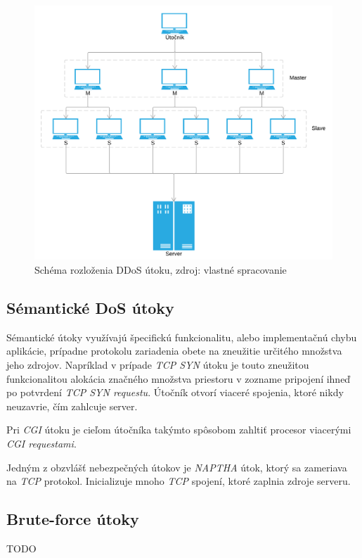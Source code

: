 \documentclass[
  printed, %
  table,   %
  lof,     %
  lot,     %
]{fithesis3}
\begin{document}
\begin{figure}[H]
  \centering
    \includegraphics[width=\textwidth]{images/ddos.png}
  \caption{Schéma rozloženia DDoS útoku, zdroj: vlastné spracovanie}
  \label{fig:cs-basic}
\end{figure}

\subsection{Sémantické DoS útoky}
Sémantické útoky využívajú špecifickú funkcionalitu, alebo implementačnú chybu aplikácie,
prípadne protokolu zariadenia obete na zneužitie určitého množstva jeho zdrojov. Napríklad
v prípade \textit{TCP SYN} útoku je touto zneužitou funkcionalitou alokácia značného množstva
priestoru v zozname pripojení ihneď po potvrdení \textit{ TCP SYN requestu}. Útočník otvorí
viaceré spojenia, ktoré nikdy neuzavrie, čím zahlcuje server. 

Pri \textit{CGI} útoku je cieľom útočníka takýmto spôsobom zahltiť procesor viacerými
\textit{CGI requestami}.

Jedným z obzvlášť nebezpečných útokov je \textit{NAPTHA} útok, ktorý sa zameriava na
\textit{TCP} protokol. Inicializuje mnoho \textit{TCP} spojení, ktoré zaplnia zdroje serveru.

\subsection{Brute-force útoky}
TODO 
\end{document}
